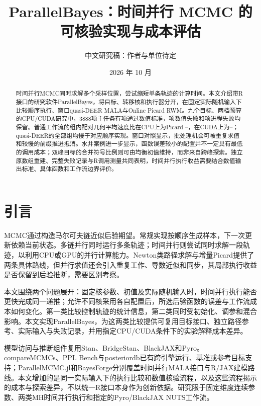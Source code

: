 \documentclass[UTF8,fontset=fandol,zihao=-4]{ctexart}
\title{ParallelBayes：时间并行 MCMC 的可核验实现与成本评估}
\author{中文研究稿：作者与单位待定}
\date{2026 年 10 月}
\begin{document}
\maketitle
\begin{abstract}
时间并行MCMC同时求解多个采样位置，尝试缩短单条轨迹的计算时间。本文介绍带R接口的研究软件ParallelBayes，将目标、转移核和执行器分开，在固定实际随机输入下比较顺序执行、窗口quasi-DEER MALA与Online Picard RWM。九个目标、两档预算的CPU/CUDA研究中，3888项主任务有\PBCompactValid{}项通过数值标准，\PBCompactNumerical{}项数值失败和\PBCompactUnclassified{}项进程失败均保留。普通工作流的组内配对几何平均速度比在CPU上为Picard \PBCPURWMMin--\PBCPURWMMax，在CUDA上为\PBCUDARWMMin--\PBCUDARWMMax；quasi-DEER的全部组均慢于对应顺序实现。窗口对照显示，批处理机会可被重复求值和较慢的前缀推进抵消。水井案例进一步显示，函数误差较小的配置并不一定具有最低的调用成本；双峰目标的合并符号比例则可由均衡初值维持，而非来自跨峰探索。独立原数组重建、完整失败记录与R调用测量共同表明，时间并行执行收益需要结合数值输出标准、具体函数和工作流边界评价。
\end{abstract}

\section{引言}
MCMC通过构造马尔可夫链近似后验期望。常规实现按顺序生成样本，下一次更新依赖当前状态。多链并行同时运行多条轨迹；时间并行则尝试同时求解一段轨迹，以利用CPU或GPU的并行计算能力。Newton类路径求解与增量Picard提供了两条具体路线\cite{zoltowski,grazzi}，但并行求值还会引入重复工作、导数近似和同步，其局部执行收益是否保留到后验推断，需要区别考察。

本文围绕两个问题展开：固定核参数、初值及实际随机输入时，时间并行执行能否更快完成同一递推；允许不同核采用各自配置后，所选后验函数的误差与工作流成本如何变化。第一类比较控制轨迹的统计信息，第二类同时受初始化、调参和混合影响。本文实现ParallelBayes，为这两类比较提供可复用目标接口、独立路径参考、实际输入与失败记录，并用指定CPU/CUDA条件下的实验解释成本差异。

模型访问与推断组件复用Stan、BridgeStan、BlackJAX和Pyro\cite{stan,bridgestan,blackjax,pyro}。compareMCMCs、PPL Bench与posteriordb已有跨引擎运行、基准或参考目标支持\cite{comparemcmcs,pplbench,posteriordb}；ParallelMCMC.jl和BayesForge分别覆盖时间并行MALA接口与R/JAX建模路线\cite{parallelmcmc,bayesforge}。本文增加的是同一实际输入下的执行比较和数值核验流程，以及这些流程揭示的成本与探索差异，不以统一R接口本身作为创新依据。研究限于固定维度连续参数、两类MH时间并行执行和指定的Pyro/BlackJAX NUTS工作流。
\end{document}
